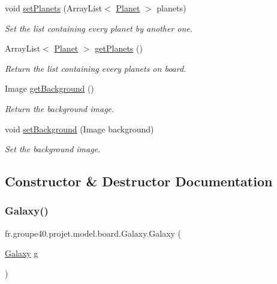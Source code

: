 \begin{DoxyCompactItemize}
void \mbox{\hyperlink{classfr_1_1groupe40_1_1projet_1_1model_1_1board_1_1_galaxy_a7f400bf11202afef051fccbc9cc727a9}{set\+Planets}} (Array\+List$<$ \mbox{\hyperlink{classfr_1_1groupe40_1_1projet_1_1model_1_1planets_1_1_planet}{Planet}} $>$ planets)
\begin{DoxyCompactList}\small\item\em Set the list containing every planet by another one. \end{DoxyCompactList}\item 
Array\+List$<$ \mbox{\hyperlink{classfr_1_1groupe40_1_1projet_1_1model_1_1planets_1_1_planet}{Planet}} $>$ \mbox{\hyperlink{classfr_1_1groupe40_1_1projet_1_1model_1_1board_1_1_galaxy_a9e97906db3f8da0d99dfcb0f272d476b}{get\+Planets}} ()
\begin{DoxyCompactList}\small\item\em Return the list containing every planets on board. \end{DoxyCompactList}\item 
Image \mbox{\hyperlink{classfr_1_1groupe40_1_1projet_1_1model_1_1board_1_1_galaxy_adc4718307d1288fe07acabd1f31415c9}{get\+Background}} ()
\begin{DoxyCompactList}\small\item\em Return the background image. \end{DoxyCompactList}\item 
void \mbox{\hyperlink{classfr_1_1groupe40_1_1projet_1_1model_1_1board_1_1_galaxy_a765e649c1488992dbf1247ae9a1adaf7}{set\+Background}} (Image background)
\begin{DoxyCompactList}\small\item\em Set the background image. \end{DoxyCompactList}\end{DoxyCompactItemize}


\subsection{Constructor \& Destructor Documentation}
\mbox{\label{classfr_1_1groupe40_1_1projet_1_1model_1_1board_1_1_galaxy_ae10e23d6a41a5b878123a8b03ec31e5a}} 
\subsubsection{\texorpdfstring{Galaxy()}{Galaxy()}\hspace{0.1cm}{\footnotesize\ttfamily [1/2]}}
{\footnotesize\ttfamily fr.\+groupe40.\+projet.\+model.\+board.\+Galaxy.\+Galaxy (\begin{DoxyParamCaption}\item[{\mbox{\hyperlink{classfr_1_1groupe40_1_1projet_1_1model_1_1board_1_1_galaxy}{Galaxy}}}]{g }\end{DoxyParamCaption})}



